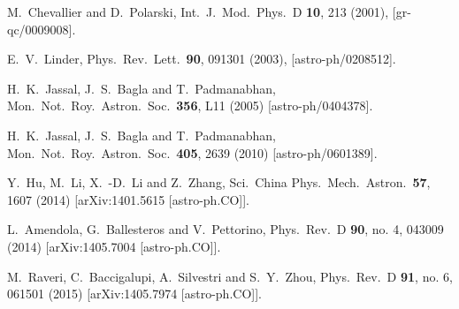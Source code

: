 \documentclass[prd,nofootinbib,showpacs]{revtex4}
\begin{document}
{\begin{thebibliography}{999}
	
  M.~Chevallier and D.~Polarski,
  Int.\ J.\ Mod.\ Phys.\ D {\bf 10}, 213 (2001),
 [gr-qc/0009008].
	
  E.~V.~Linder,
  Phys.\ Rev.\ Lett.\  {\bf 90}, 091301 (2003),
  [astro-ph/0208512].




  H.~K.~Jassal, J.~S.~Bagla and T.~Padmanabhan,
  Mon.\ Not.\ Roy.\ Astron.\ Soc.\  {\bf 356}, L11 (2005)
  [astro-ph/0404378].
  
  H.~K.~Jassal, J.~S.~Bagla and T.~Padmanabhan,
  Mon.\ Not.\ Roy.\ Astron.\ Soc.\  {\bf 405}, 2639 (2010)
  [astro-ph/0601389].

  Y.~Hu, M.~Li, X.~-D.~Li and Z.~Zhang,
  Sci.\ China Phys.\ Mech.\ Astron.\  {\bf 57}, 1607 (2014)
  [arXiv:1401.5615 [astro-ph.CO]].
	
	

  
  L.~Amendola, G.~Ballesteros and V.~Pettorino,
  Phys.\ Rev.\ D {\bf 90}, no. 4, 043009 (2014)
  [arXiv:1405.7004 [astro-ph.CO]].


  M.~Raveri, C.~Baccigalupi, A.~Silvestri and S.~Y.~Zhou,
  Phys.\ Rev.\ D {\bf 91}, no. 6, 061501 (2015)
  [arXiv:1405.7974 [astro-ph.CO]].
  

\end{thebibliography}}
\end{document}
